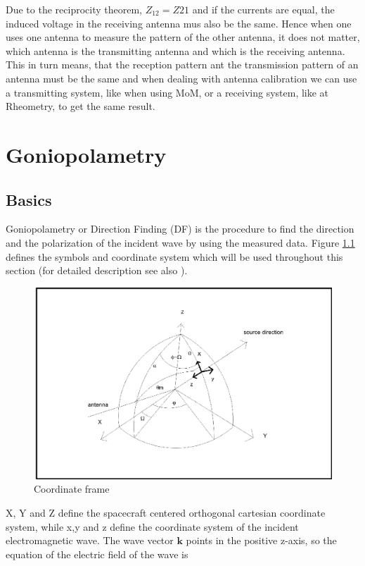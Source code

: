 \documentclass[a4paper,11pt]{report}
\begin{document}
Due to the reciprocity theorem, $Z_{12}=Z{21}$ and if the currents are equal, the induced voltage in the receiving antenna mus also be the same. Hence when one uses one antenna to measure the pattern of the other antenna, it does not matter, which antenna is the transmitting antenna and which is the receiving antenna. This in turn means, that the reception pattern ant the transmission pattern of an antenna must be the same and when dealing with antenna calibration we can use a transmitting system, like when using MoM, or a receiving system, like at Rheometry, to get the same result.

\chapter{Goniopolametry}
\section{Basics}
Goniopolametry or Direction Finding (DF) is the procedure to find the direction and the polarization of the incident wave by using the measured data. Figure \ref{fig_coordinate_frame_DF} defines the symbols and coordinate system which will be used throughout this section (for detailed description see also
\cite{ladreiter_03}).\\

\begin{figure}
  \includegraphics[width=12cm]{df_coordinate_system}
  \caption{Coordinate frame}\label{fig_coordinate_frame_DF}
\end{figure}

X, Y and Z define the spacecraft centered orthogonal cartesian coordinate system, while x,y and z define the coordinate system of the incident electromagnetic wave. The wave vector $\textbf{k}$ points in the positive z-axis, so the equation of the electric field of the wave is
\end{document}
